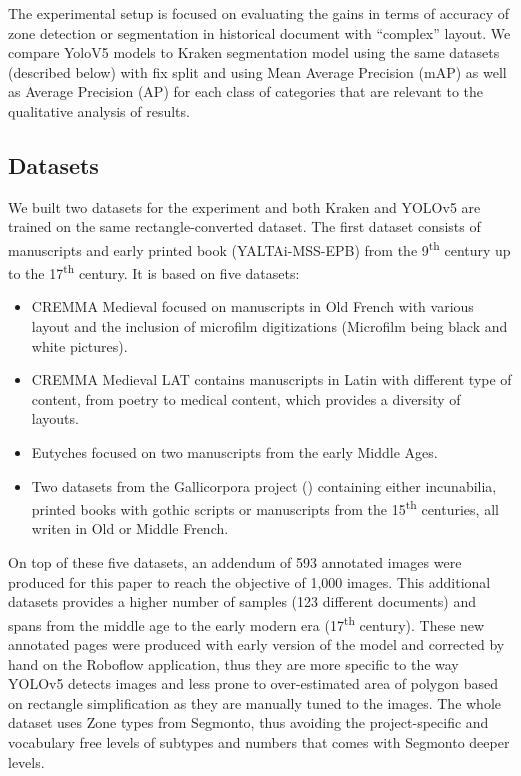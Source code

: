 \documentclass{jdmdh}
\begin{document}
The experimental setup is focused on evaluating the gains in terms of accuracy of zone detection or segmentation in historical document with ``complex'' layout. We compare YoloV5 models to Kraken segmentation model using the same datasets (described below) with fix split and using Mean Average Precision (mAP) as well as Average Precision (AP) for each class of categories that are relevant to the qualitative analysis of results.

\subsection{Datasets}

We built two datasets for the experiment and both Kraken and YOLOv5 are trained on the same rectangle-converted dataset. The first dataset consists of manuscripts and early printed book (YALTAi-MSS-EPB) from the 9\textsuperscript{th} century up to the 17\textsuperscript{th} century. It is based on five datasets:

\begin{itemize}
    \item CREMMA Medieval \citep{pinche2022cremma} focused on manuscripts in Old French with various layout and the inclusion of microfilm digitizations (Microfilm being black and white pictures).
    \item CREMMA Medieval LAT \citep{clerice2022cremma} contains manuscripts in Latin with different type of content, from poetry to medical content, which provides a diversity of layouts.
    \item Eutyches \citep{vlachou-efstathiou2022voss} focused on two manuscripts from the early Middle Ages.
    \item Two datasets from the Gallicorpora project (\citep{pinche2022donn, pinche2022donn2, pinche2022donn3}) containing either incunabilia, printed books with gothic scripts or manuscripts from the 15\textsuperscript{th} centuries, all writen in Old or Middle French.
\end{itemize}

On top of these five datasets, an addendum of 593 annotated images were produced for this paper to reach the objective of 1,000 images. This additional datasets provides a higher number of samples (123 different documents) and spans from the middle age to the early modern era (17\textsuperscript{th} century). These new annotated pages were produced with early version of the model and corrected by hand on the Roboflow application, thus they are more specific to the way YOLOv5 detects images and less prone to over-estimated area of polygon based on rectangle simplification as they are manually tuned to the images. The whole dataset uses Zone types from Segmonto, thus avoiding the project-specific and vocabulary free levels of subtypes and numbers that comes with Segmonto deeper levels.
\end{document}

